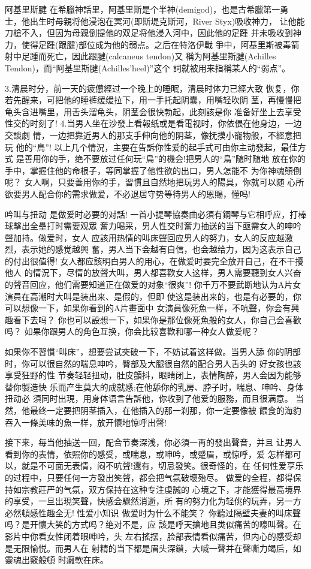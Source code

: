 \documentclass[12pt,UTF8]{ctexbook}
\begin{document}
阿基里斯腱
在希臘神話里，阿基里斯是个半神(demigod)，也是古希臘第一勇
士，他出生时母親将他浸泡在冥河(即斯堤克斯河，River Styx)吸收神力，
让他能刀槍不入，但因为母親倒提他的双足将他浸入河中，因此他的足踵
并未吸收到神力，使得足踵(跟腱)部位成为他的弱点。之后在特洛伊戰
爭中，阿基里斯被毒箭射中足踵而死亡，因此跟腱(calcaneus tendon)又
稱为阿基里斯腱(Achilles Tendon)，而“阿基里斯腱(Achilles'heel)”这个
詞就被用来指稱某人的“弱点”。

3.清晨时分，前一天的疲憊經过一个晚上的睡眠，清晨时体力已經大致
恢复，你若先醒来，可把他的睡裤缓缓拉下，用一手托起阴囊，用嘴轻吹阴
茎，再慢慢把龟头含进嘴里，用舌头溜龟头，阴茎会很快勃起，此刻該是你
准备好坐上去享受性交的时刻了!
4.当男人坐在沙發上看報纸或是看電视时，你依偎在他身边，一边交談劇
情，一边把靠近男人的那支手伸向他的阴茎，像抚摸小寵物般，不經意把玩
他的“鳥”!
以上几个情況，主要在告訴你性爱的起手式可由你主动發起，最佳方式
是善用你的手，绝不要放过任何玩“鳥”的機会!把男人的“鳥”随时随地
放在你的手中，掌握住他的命根子，等同掌握了他性欲的出口，男人怎能不
为你神魂顛倒呢？
女人啊，只要善用你的手，習慣且自然地把玩男人的陽具，你就可以随
心所欲要男人配合你的需求做爱，不必退居守势等待男人的恩賜，懂吗!

吟叫与扭动
是做爱时必要的对話!
一首小提琴協奏曲必須有鋼琴与它相呼应，打棒球擊出全壘打时需要观眾
奮力喝采，男人性交时奮力抽送的当下亟需女人的呻吟聲加持。做爱时，女人
应該用热情的叫床聲回应男人的努力，女人的反应越激烈，表示她的感觉越興
奮，男人当下会越有自信，也会越给力，因为这表示自己的付出很值得!
女人都应該明白男人的用心，在做爱时要完全放开自己，在不干擾他人
的情況下，尽情的放聲大叫，男人都喜歡女人这样，男人需要聽到女人兴奋
的聲音回应，他们需要知道正在做爱的对象“很爽”!
你千万不要武断地认为A片女演員在高潮时大叫是装出来、是假的，但即
使这是装出来的，也是有必要的，你可以想像一下，如果你看到的A片畫面中
女演員像死魚一样，不吭聲，你会有興趣看下去吗？
你也可以設想一下，如果你是那位像死魚般的女人，你自己会喜歡吗？
如果你跟男人的角色互换，你会比较喜歡和哪一种女人做爱呢？

如果你不習慣“叫床”，想要尝试突破一下，不妨试着这样做。当男人舔
你的阴部时，你可以很自然的喘息呻吟，臀部及大腿很自然的配合男人舌头的
好女孩也該享受狂野的性
节奏轻轻扭动，肚皮顫抖，眼睛闭上，表情陶醉，男人会因为能够替你製造快
乐而产生莫大的成就感;在他舔你的乳房、脖子时，喘息、呻吟、身体扭动必
須同时出現，用身体语言告訴他，你收到了他爱的服務，而且很满意。
当然，他最终一定要把阴茎插入，在他插入的那一刹那，你一定要像被
餵食的海豹吞入一條美味的魚一样，放开懷地惊呼出聲!

接下来，每当他抽送一回，配合节奏深浅，你必須一再的發出聲音，并且
让男人看到你的表情，依照你的感受，或喘息，或呻吟，或蹙眉，或惊呼，爱
怎样都可以，就是不可面无表情，闷不吭聲!還有，切忌發笑。很奇怪的，在
任何性爱享乐的过程中，只要任何一方發出笑聲，都会把气氛破壞殆尽。
做爱的全程，都得保持如宗教莊严的气氛，双方保持在这种专注虔誠的
心境之下，才能獲得最高境界的享受，一旦出現笑聲，快感会驟然消逝，所
有的努力化为轻佻的玩弄，另一方必然頓感性趣全无!
性爱小知识
做爱时为什么不能笑？
你聽过隔壁夫妻的叫床聲吗？是开懷大笑的方式吗？绝对不是，应
該是呼天搶地且类似痛苦的嚎叫聲。在影片中你看女性闭着眼呻吟，头
左右搖摆，脸部表情看似痛苦，但内心的感受却是无限愉悦。而男人在
射精的当下都是眉头深鎖，大喊一聲并在聲嘶力竭后，如靈魂出竅般頓
时癱軟在床。
\end{document}
